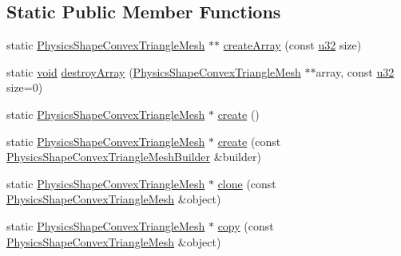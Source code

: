 \subsection*{Static Public Member Functions}
\begin{DoxyCompactItemize}
\item 
static \mbox{\hyperlink{classnjli_1_1_physics_shape_convex_triangle_mesh}{Physics\+Shape\+Convex\+Triangle\+Mesh}} $\ast$$\ast$ \mbox{\hyperlink{classnjli_1_1_physics_shape_convex_triangle_mesh_af9375054b0d4a6b18a833ef01917857b}{create\+Array}} (const \mbox{\hyperlink{_util_8h_a10e94b422ef0c20dcdec20d31a1f5049}{u32}} size)
\item 
static \mbox{\hyperlink{_thread_8h_af1e856da2e658414cb2456cb6f7ebc66}{void}} \mbox{\hyperlink{classnjli_1_1_physics_shape_convex_triangle_mesh_a6459cef88563e5ec60b75087e92df163}{destroy\+Array}} (\mbox{\hyperlink{classnjli_1_1_physics_shape_convex_triangle_mesh}{Physics\+Shape\+Convex\+Triangle\+Mesh}} $\ast$$\ast$array, const \mbox{\hyperlink{_util_8h_a10e94b422ef0c20dcdec20d31a1f5049}{u32}} size=0)
\item 
static \mbox{\hyperlink{classnjli_1_1_physics_shape_convex_triangle_mesh}{Physics\+Shape\+Convex\+Triangle\+Mesh}} $\ast$ \mbox{\hyperlink{classnjli_1_1_physics_shape_convex_triangle_mesh_a5884ff06b5fba44d4c5f8575cddc0cd4}{create}} ()
\item 
static \mbox{\hyperlink{classnjli_1_1_physics_shape_convex_triangle_mesh}{Physics\+Shape\+Convex\+Triangle\+Mesh}} $\ast$ \mbox{\hyperlink{classnjli_1_1_physics_shape_convex_triangle_mesh_a1c38787be54ebd44f9f7050e6074e382}{create}} (const \mbox{\hyperlink{classnjli_1_1_physics_shape_convex_triangle_mesh_builder}{Physics\+Shape\+Convex\+Triangle\+Mesh\+Builder}} \&builder)
\item 
static \mbox{\hyperlink{classnjli_1_1_physics_shape_convex_triangle_mesh}{Physics\+Shape\+Convex\+Triangle\+Mesh}} $\ast$ \mbox{\hyperlink{classnjli_1_1_physics_shape_convex_triangle_mesh_ae0f2cc0e5cbff56245424b4235db842c}{clone}} (const \mbox{\hyperlink{classnjli_1_1_physics_shape_convex_triangle_mesh}{Physics\+Shape\+Convex\+Triangle\+Mesh}} \&object)
\item 
static \mbox{\hyperlink{classnjli_1_1_physics_shape_convex_triangle_mesh}{Physics\+Shape\+Convex\+Triangle\+Mesh}} $\ast$ \mbox{\hyperlink{classnjli_1_1_physics_shape_convex_triangle_mesh_a843d37268a560c1512ee1cbb6405c46d}{copy}} (const \mbox{\hyperlink{classnjli_1_1_physics_shape_convex_triangle_mesh}{Physics\+Shape\+Convex\+Triangle\+Mesh}} \&object)

\end{DoxyCompactItemize}
